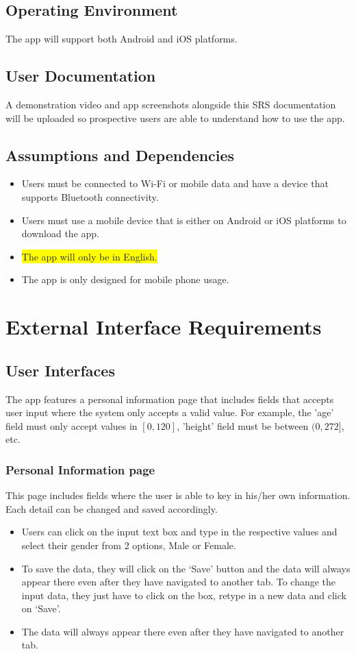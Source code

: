\documentclass[a4paper]{scrreprt}
\begin{document}
\section{Operating Environment}
The app will support both Android and iOS platforms. 

\section{User Documentation}
A demonstration video and app screenshots alongside this SRS documentation will be uploaded so prospective users are able to understand how to use the app.

\section{Assumptions and Dependencies}
\begin{itemize}
    \item Users must be connected to Wi-Fi or mobile data and have a device that supports Bluetooth connectivity.
    \item Users must use a mobile device that is either on Android or iOS platforms to download the app.
    \item \colorbox{yellow}{The app will only be in English.}
    \item The app is only designed for mobile phone usage.
\end{itemize}

\chapter{External Interface Requirements}
\section{User Interfaces}
The app features a personal information page that includes fields that accepts user input where the system only accepts a valid value. For example, the 'age' field must only accept values in $[0, 120]$, 'height' field must be between $(0, 272]$, etc.
\newline
\subsection{Personal Information page}
This page includes fields where the user is able to key in his/her own information. Each detail can be changed and saved accordingly.

\begin{itemize}
    \item Users can click on the input text box and type in the respective values and select their gender from 2 options, Male or Female.
    \item To save the data, they will click on the ‘Save’ button and the data will always appear there even after they have navigated to another tab. To change the input data, they just have to click on the box, retype in a new data and click on ‘Save’.
    \item The data will always appear there even after they have navigated to another tab.
\end{itemize}
\end{document}
